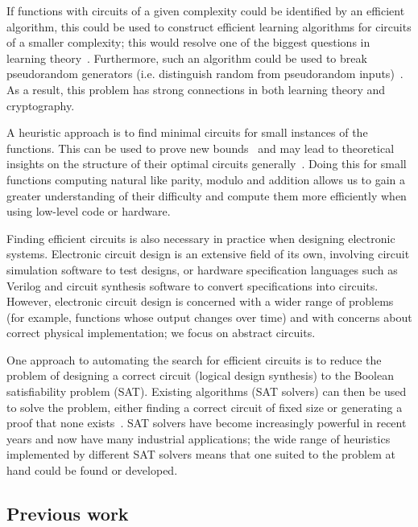 \documentclass{article}
\begin{document}
If functions with circuits of a given complexity could be identified by an efficient algorithm, this could be used to construct efficient learning algorithms for circuits of a smaller complexity; this would resolve one of the biggest questions in learning theory~\cite{carmosino}. Furthermore, such an algorithm could be used to break pseudorandom generators (i.e. distinguish random from pseudorandom inputs)~\cite{razborov94}. As a result, this problem has strong connections in both learning theory and cryptography.

A heuristic approach is to find minimal circuits for small instances of the functions. This can be used to prove new bounds~\cite{kulikovsurvey} and may lead to theoretical insights on the structure of their optimal circuits generally~\cite{williams}. Doing this for small functions computing natural like parity, modulo and addition allows us to gain a greater understanding of their difficulty and compute them more efficiently when using low-level code or hardware. 

Finding efficient circuits is also necessary in practice when designing electronic systems. Electronic circuit design is an extensive field of its own, involving circuit simulation software to test designs, or hardware specification languages such as Verilog and circuit synthesis software to convert specifications into circuits. However, electronic circuit design is concerned with a wider range of problems (for example, functions whose output changes over time) and with concerns about correct physical implementation; we focus on abstract circuits.

One approach to automating the search for efficient circuits is to reduce the problem of designing a correct circuit (logical design synthesis) to the Boolean satisfiability problem (SAT). Existing algorithms (SAT solvers) can then be used to solve the problem, either finding a correct circuit of fixed size or generating a proof that none exists~\cite{kulikov}. SAT solvers have become increasingly powerful in recent years and now have many industrial applications\cite{prasad}; the wide range of heuristics implemented by different SAT solvers means that one suited to the problem at hand could be found or developed. 

\subsection{Previous work}
\end{document}
